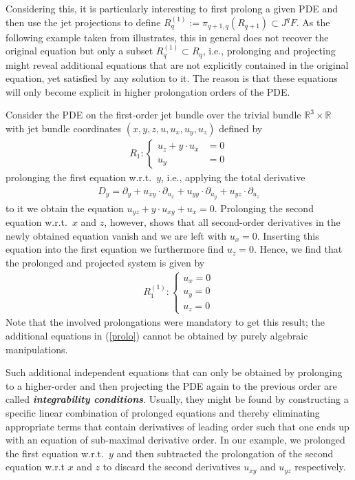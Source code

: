 Considering this, it is particularly interesting to first prolong a given PDE and then use the jet projections to define $R_q^{(1)} := \pi_{q+1,q}\left ( R_{q+1} \right ) \subset J^qF $. As the following example taken from \cite{seiler1994analysis} illustrates, this in general does not recover the original equation but only a subset $R_q^{(1)} \subset R_q$, i.e., prolonging and projecting might reveal additional equations that are not explicitly contained in the original equation, yet satisfied by any solution to it. The reason is that these equations will only become explicit in higher prolongation orders of the PDE.
\begin{example}\label{ExamplePDE}
Consider the PDE on the first-order jet bundle over the trivial bundle $\mathbb{R}^3 \times \mathbb{R}$ with jet bundle  coordinates $(x,y,z,u,u_x,u_y,u_z)$ defined by
\begin{align}
    R_1 : \begin{cases} u_z + y \cdot u_x &= 0 \\
                        u_y &= 0
            \end{cases}
\end{align}
prolonging the first equation w.r.t.\ $y$, i.e., applying the total derivative 
\begin{align}
D_y = \partial_y + u_{xy} \cdot \partial_{u_x} + u_{yy} \cdot \partial_{u_y} + u_{yz} \cdot \partial_{u_z}
\end{align}
to it we obtain the equation $u_{yz} + y \cdot u_{xy} + u_x =0$. Prolonging the second equation w.r.t.\ $x$ and $z$, however, shows that all second-order derivatives in the newly obtained equation vanish and we are left with $u_x = 0$. Inserting this equation into the first equation we furthermore find $u_z = 0$. Hence, we find that the prolonged and projected system is given by 
\begin{align}\label{prolo}
    R_1^{(1)} : \begin{cases} u_x = 0 \\
                        u_y = 0\\
                        u_z = 0 
            \end{cases}
\end{align}
Note that the involved prolongations were mandatory to get this result; the additional equations in (\ref{prolo})  cannot be obtained by purely algebraic manipulations. 
\end{example}
Such additional independent equations that can only be obtained by prolonging to a higher-order and then projecting the PDE again to the previous order are called \textit{\textbf{integrability conditions}}. 
Usually, they might be found by constructing a specific linear combination of prolonged equations and thereby eliminating appropriate terms that contain derivatives of leading order such that one ends up with an equation of sub-maximal derivative order. In our example, we prolonged the first equation w.r.t.\ $y$ and then subtracted the prolongation of the second equation w.r.t $x$ and $z$ to discard the second derivatives $u_{xy}$ and $u_{yz}$ respectively. 


